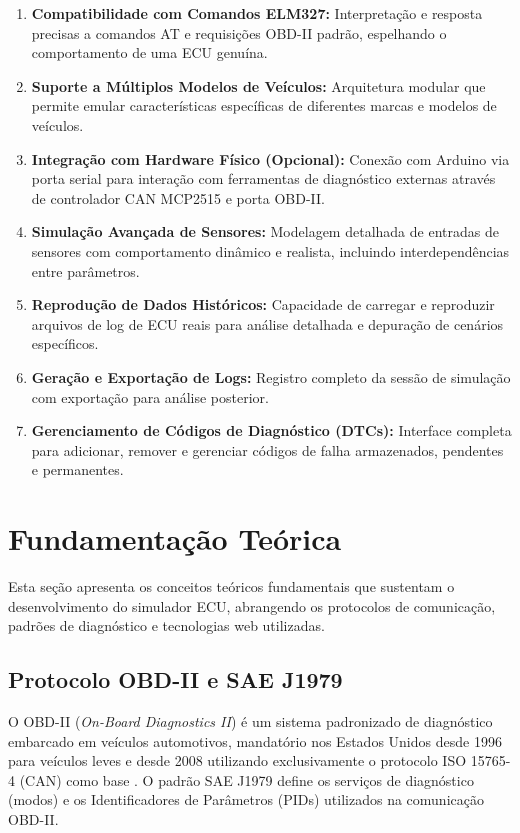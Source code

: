 \begin{enumerate}
    \item \textbf{Compatibilidade com Comandos ELM327:} Interpretação e resposta precisas a comandos AT e requisições OBD-II padrão, espelhando o comportamento de uma ECU genuína.
    \item \textbf{Suporte a Múltiplos Modelos de Veículos:} Arquitetura modular que permite emular características específicas de diferentes marcas e modelos de veículos.
    \item \textbf{Integração com Hardware Físico (Opcional):} Conexão com Arduino via porta serial para interação com ferramentas de diagnóstico externas através de controlador CAN MCP2515 e porta OBD-II.
    \item \textbf{Simulação Avançada de Sensores:} Modelagem detalhada de entradas de sensores com comportamento dinâmico e realista, incluindo interdependências entre parâmetros.
    \item \textbf{Reprodução de Dados Históricos:} Capacidade de carregar e reproduzir arquivos de log de ECU reais para análise detalhada e depuração de cenários específicos.
    \item \textbf{Geração e Exportação de Logs:} Registro completo da sessão de simulação com exportação para análise posterior.
    \item \textbf{Gerenciamento de Códigos de Diagnóstico (DTCs):} Interface completa para adicionar, remover e gerenciar códigos de falha armazenados, pendentes e permanentes.
\end{enumerate}

\section{Fundamentação Teórica}
\label{sec:fundamentacao}

Esta seção apresenta os conceitos teóricos fundamentais que sustentam o desenvolvimento do simulador ECU, abrangendo os protocolos de comunicação, padrões de diagnóstico e tecnologias web utilizadas.

\subsection{Protocolo OBD-II e SAE J1979}

O OBD-II (\textit{On-Board Diagnostics II}) é um sistema padronizado de diagnóstico embarcado em veículos automotivos, mandatório nos Estados Unidos desde 1996 para veículos leves e desde 2008 utilizando exclusivamente o protocolo ISO 15765-4 (CAN) como base \cite{sae_j1979}. O padrão SAE J1979 define os serviços de diagnóstico (modos) e os Identificadores de Parâmetros (PIDs) utilizados na comunicação OBD-II.

